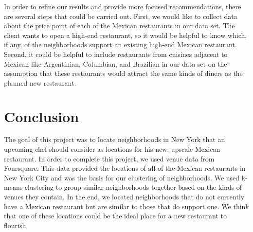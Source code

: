 \documentclass{article}
\begin{document}
In order to refine our results and provide more focused recommendations, there are several steps that could be carried out. First, we would like to collect data about the price point of each of the Mexican restaurants in our data set. The client wants to open a high-end restaurant, so it would be helpful to know which, if any, of the neighborhoods support an existing high-end Mexican restaurant. Second, it could be helpful to include restaurants from cuisines adjacent to Mexican like Argentinian, Columbian, and Brazilian in our data set on the assumption that these restaurants would attract the same kinds of diners as the planned new restaurant.

\section{Conclusion}

The goal of this project was to locate neighborhoods in New York that an upcoming chef should consider as locations for his new, upscale Mexican restaurant. In order to complete this project, we used venue data from Foursquare. This data provided the locations of all of the Mexican restaurants in New York City and was the basis for our clustering of neighborhoods. We used k-means clustering to group similar neighborhoods together based on the kinds of venues they contain. In the end, we located neighborhoods that do not currently have a Mexican restaurant but are similar to those that do support one. We think that one of these locations could be the ideal place for a new restaurant to flourish.
\end{document}
